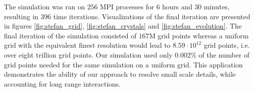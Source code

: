 The simulation was ran on $256$ MPI processes for $6$ hours and $30$ minutes, resulting in $396$ time iterations. Visualizations of the final iteration are presented in figures \ref{fig:stefan_grid}, \ref{fig:stefan_crystals} and \ref{fig:stefan_evolution}. The final iteration of the simulation consisted of $167$M grid points whereas a uniform grid with the equivalent finest resolution would lead to $8.59\cdot10^{12}$ grid points, i.e. over eight trillion grid points. Our simulation used only $0.002\%$ of the number of grid points needed for the same simulation on a uniform grid. This application demonstrates the ability of our approach to resolve small scale details, while accounting for long range interactions.

\begin{figure}[ht!]
\begin{center}

\end{center}
\end{figure}
